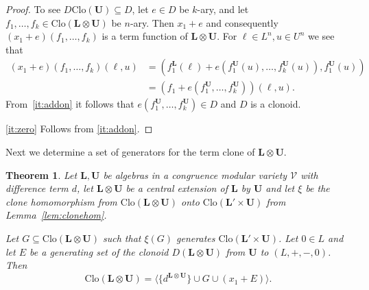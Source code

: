 \documentclass[12pt]{amsart}
\numberwithin{equation}{section}
\theoremstyle{plain}
\newtheorem{theorem}{Theorem}[section]
\theoremstyle{definition}
\renewcommand{\L}{\mathbf{L}}
\newcommand{\U}{\mathbf{U}}
\newcommand{\V}{\mathcal{V}}
\newcommand{\Clo}{\mathrm{Clo}}
\begin{document}
\begin{proof}
  To see $D\Clo(\U) \subseteq D$, let $e\in D$ be $k$-ary, and let $f_1,\dots,f_k\in\Clo(\L\otimes\U)$ be $n$-ary.
  Then $x_1+e$ and consequently $(x_1+e)(f_1,\dots,f_k)$ is a term function of $\L\otimes\U$.
  For $\ell\in L^n,u\in U^n$ we see that
    \begin{align*}
      (x_1+e)(f_1,\dots,f_k)(\ell,u) & = (f^\L_1(\ell)+ e(f_1^\U(u),\dots,f^\U_k(u)), f_1^\U(u) ) \\
      & = (f_1+ e(f_1^\U,\dots,f^\U_k)) (\ell,u).           
    \end{align*}
  From~\eqref{it:addon} it follows that $e(f_1^\U,\dots,f^\U_k)  \in D$ and $D$ is a clonoid.
 
  \eqref{it:zero} 
    Follows from \eqref{it:addon}.
\end{proof}

Next we determine a set of generators for the term clone of $\L \otimes \U$. 

\begin{theorem} \label{thm:clonegens}
  Let $\L,\U$ be algebras in a congruence modular variety $\V$ with difference term $d$, 
    let $\L\otimes\U$ be a central extension of $\L$ by $\U$ and let $\xi$ be the clone 
    homomorphism from $\Clo(\L\otimes\U)$ onto $\Clo(\L'\times\U)$ from Lemma~\ref{lem:clonehom}.
 
  Let $G \subseteq \Clo(\L\otimes\U)$ such that $\xi(G)$ generates $\Clo(\L'\times\U)$.
  Let $0 \in L$ and let $E$ be a generating set of
    the clonoid $D(\L\otimes\U)$ from $\U$ to $(L, +, -, 0)$.
  Then
    \[ \Clo(\L\otimes\U) = \langle \{d^{\L\otimes\U}\} \cup G \cup (x_1+E) \rangle. \]
\end{theorem}
\end{document}
